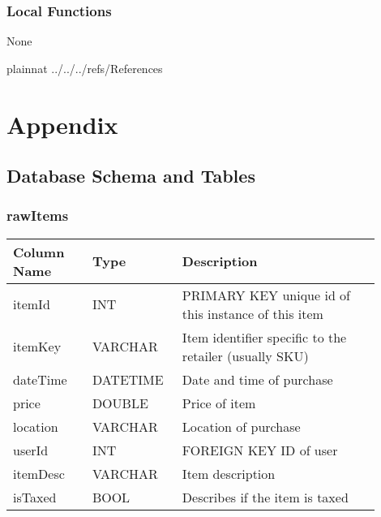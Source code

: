 \documentclass[12pt, titlepage]{article}
\begin{document}
\subsubsection{Local Functions}
None

\newpage

 {plainnat}
 {../../../refs/References}

\newpage

\section{Appendix} \label{Appendix}

\subsection{Database Schema and Tables} \label{dbAppendix}

\subsubsection{rawItems}
\begin{table}[H]
  \begin{tabular}{|p{0.2\linewidth}|p{0.2\linewidth}|p{0.5\linewidth}|}
    \hline
    \textbf{Column Name} & \textbf{Type} & \textbf{Description} \\
    \hline
    itemId & INT & PRIMARY KEY unique id of this instance of this item \\
    \hline
    itemKey & VARCHAR & Item identifier specific to the retailer (usually SKU) \\
    \hline
    dateTime & DATETIME & Date and time of purchase \\
    \hline
    price & DOUBLE & Price of item \\
    \hline
    location & VARCHAR & Location of purchase \\
    \hline
    userId & INT & FOREIGN KEY ID of user\\
    \hline
    itemDesc & VARCHAR & Item description\\
    \hline
    isTaxed & BOOL & Describes if the item is taxed\\
    \hline
  \end{tabular}
\end{table}
\end{document}
